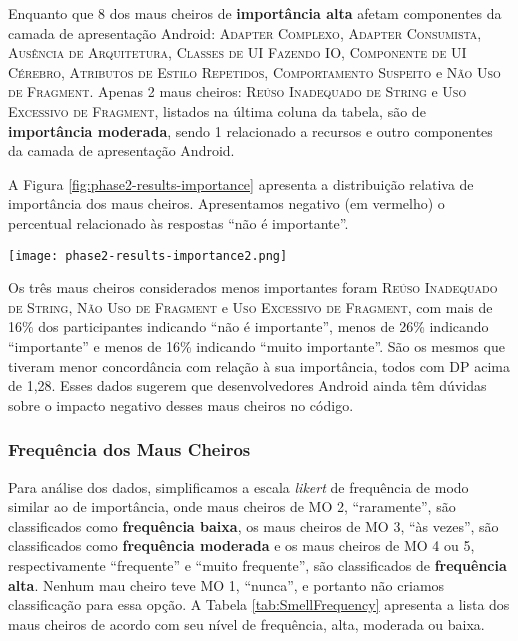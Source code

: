 Enquanto que 8 dos maus cheiros de \textbf{\small importância alta} afetam componentes da camada de apresentação Android: \textsc{\small Adapter Complexo}, \textsc{\small Adapter Consumista}, \textsc{\small Ausência de Arquitetura}, \textsc{\small Classes de UI Fazendo IO}, \textsc{\small Componente de UI Cérebro}, \textsc{\small Atributos de Estilo Repetidos}, \textsc{\small Comportamento Suspeito} e \textsc{\small Não Uso de Fragment}. Apenas 2 maus cheiros: \textsc{\small Reúso Inadequado de String} e \textsc{\small Uso Excessivo de Fragment}, listados na última coluna da tabela, são de \textbf{\small importância moderada}, sendo 1 relacionado a recursos e outro componentes da camada de apresentação Android.

A Figura \ref{fig:phase2-results-importance} apresenta a distribuição relativa de importância dos maus cheiros. Apresentamos negativo (em vermelho) o percentual relacionado às respostas ``não é importante''.

\begin{figure*}[!htb]
  \centering
  \texttt{[image: phase2-results-importance2.png]}
  \caption{Distribuição relativa de importância dos maus cheiros propostos.}
  \label{fig:phase2-results-importance}
\end{figure*}

Os três maus cheiros considerados menos importantes foram \textsc{\small Reúso Inadequado de String}, \textsc{\small Não Uso de Fragment} e \textsc{\small Uso Excessivo de Fragment}, com mais de 16\% dos participantes indicando ``não é importante'', menos de 26\% indicando ``importante'' e menos de 16\% indicando ``muito importante''. São os mesmos que tiveram menor concordância com relação à sua importância, todos com DP acima de 1,28. Esses dados sugerem que desenvolvedores Android ainda têm dúvidas sobre o impacto negativo desses maus cheiros no código.


\subsubsection{Frequência dos Maus Cheiros}

Para análise dos dados, simplificamos a escala \textit{likert} de frequência de modo similar ao de importância, onde maus cheiros de MO 2, ``raramente'', são classificados como \textbf{\small frequência baixa}, os maus cheiros de MO 3, ``às vezes'', são classificados como \textbf{\small frequência moderada} e os maus cheiros de MO 4 ou 5, respectivamente ``frequente'' e ``muito frequente'', são classificados de \textbf{\small frequência alta}. Nenhum mau cheiro teve MO 1, ``nunca'', e portanto não criamos classificação para essa opção. A Tabela \ref{tab:SmellFrequency} apresenta a lista dos maus cheiros de acordo com seu nível de frequência, alta, moderada ou baixa.


